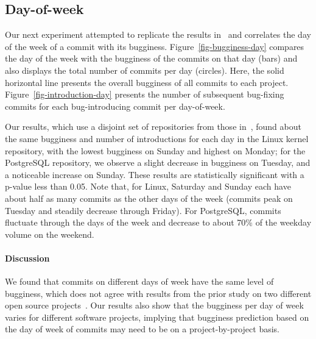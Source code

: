 \subsection{Day-of-week}
\label{sec-day-of-week}

Our next experiment attempted to replicate the results
in~\cite{sliwerski-msr-2005} and correlates the day of the week of a commit with
its bugginess. Figure~\ref{fig-bugginess-day} compares the day of the week with
the bugginess of the commits on that day (bars) and also displays the total
number of commits per day (circles). Here, the solid horizontal line presents
the overall bugginess of all commits to each project.
Figure~\ref{fig-introduction-day} presents the number of subsequent bug-fixing
commits for each bug-introducing commit per day-of-week.%

Our results, which use a disjoint set of repositories from those
in~\cite{sliwerski-msr-2005}, found about the same bugginess and number of
introductions for each day in the Linux kernel repository, with the lowest
bugginess on Sunday and highest on Monday; for the PostgreSQL repository, we
observe a slight decrease in bugginess on Tuesday, and a noticeable increase on
Sunday. These results are statistically significant with a p-value less than
0.05. Note that, for Linux, Saturday and Sunday each have about half as many
commits as the other days of the week (commits peak on Tuesday and steadily
decrease through Friday). For PostgreSQL, commits fluctuate through the days of
the week and decrease to about 70\% of the weekday volume on the weekend. %

\paragraph{Discussion}

We found that commits on different days of week have the same level of
bugginess, which does not agree with results from the prior study on two
different open source projects~\cite{sliwerski-msr-2005}. 
Our results also show that the bugginess per day of week varies for different software
projects, implying that bugginess prediction based on the day of week of
commits may need to be on a project-by-project basis.

